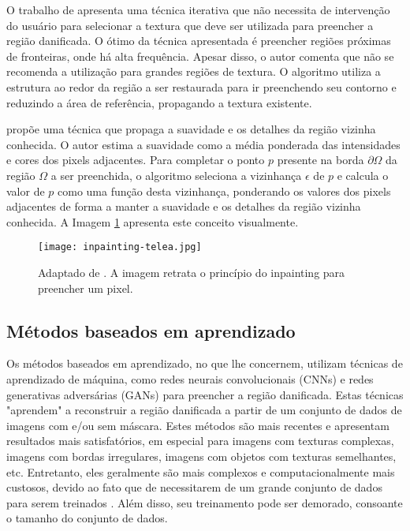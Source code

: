O trabalho de \cite{Bertalmio2000} apresenta uma técnica iterativa que não necessita de intervenção do usuário para selecionar a textura que deve ser utilizada para preencher a região danificada. O ótimo da técnica apresentada é preencher regiões próximas de fronteiras, onde há alta frequência. Apesar disso, o autor comenta que não se recomenda a utilização para grandes regiões de textura. O algoritmo utiliza a estrutura ao redor da região a ser restaurada para ir preenchendo seu contorno e reduzindo a área de referência, propagando a textura existente.

\cite{Telea2004} propõe uma técnica que propaga a suavidade e os detalhes da região vizinha conhecida. O autor estima a suavidade como a média ponderada das intensidades e cores dos pixels adjacentes. Para completar o ponto $p$ presente na borda $\partial \Omega$ da região $\Omega$ a ser preenchida, o algoritmo seleciona a vizinhança $\epsilon$ de $p$ e calcula o valor de $p$ como uma função desta vizinhança, ponderando os valores dos pixels adjacentes de forma a manter a suavidade e os detalhes da região vizinha conhecida. A Imagem \ref{fig:telea} apresenta este conceito visualmente. 

\begin{figure}[h]
\centering
\texttt{[image: inpainting-telea.jpg]}
\caption{Adaptado de \cite{Telea2004}. A imagem retrata o princípio do inpainting para preencher um pixel.
} 
\label{fig:telea}
\end{figure}

\subsection{Métodos baseados em aprendizado} \label{learn-based}
Os métodos baseados em aprendizado, no que lhe concernem, utilizam técnicas de aprendizado de máquina, como redes neurais convolucionais (CNNs) e redes generativas adversárias (GANs) para preencher a região danificada. Estas técnicas "aprendem" a reconstruir a região danificada a partir de um conjunto de dados de imagens com e/ou sem máscara. Estes métodos são mais recentes e apresentam resultados mais satisfatórios, em especial para imagens com texturas complexas, imagens com bordas irregulares, imagens com objetos com texturas semelhantes, etc. Entretanto, eles geralmente são mais complexos e computacionalmente mais custosos, devido ao fato que de necessitarem de um grande conjunto de dados para serem treinados \cite{Goodfellow-et-al-2016}. Além disso, seu treinamento pode ser demorado, consoante o tamanho do conjunto de dados.

